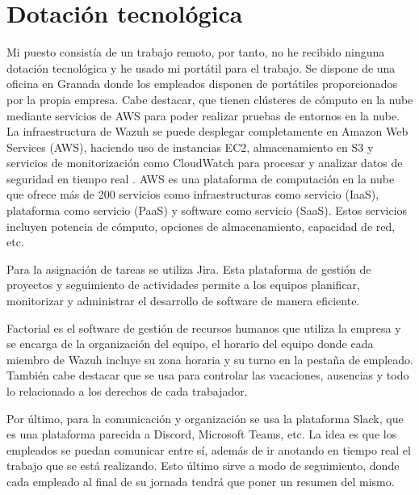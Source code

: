 \section{Dotación tecnológica}
Mi puesto consistía de un trabajo remoto, por tanto, no he recibido ninguna dotación tecnológica y he usado mi portátil para el trabajo. Se dispone de una oficina en Granada donde los empleados disponen de portátiles proporcionados por la propia empresa. Cabe destacar, que tienen clústeres de cómputo en la nube mediante servicios de AWS para poder realizar pruebas de entornos en la nube. La infraestructura de Wazuh se puede desplegar completamente en Amazon Web Services (AWS), haciendo uso de instancias EC2, almacenamiento en S3 y servicios de monitorización como CloudWatch para procesar y analizar datos de seguridad en tiempo real \cite{wazuh_agent_installation}. AWS es una plataforma de computación en la nube que ofrece más de 200 servicios como infraestructuras como servicio (IaaS), plataforma como servicio (PaaS) y software como servicio (SaaS). Estos servicios incluyen potencia de cómputo, opciones de almacenamiento, capacidad de red, etc.

Para la asignación de tareas se utiliza Jira. Esta plataforma de gestión de proyectos y seguimiento de actividades permite a los equipos planificar, monitorizar y administrar el desarrollo de software de manera eficiente.

Factorial es el software de gestión de recursos humanos que utiliza la empresa y se encarga de la organización del equipo, el horario del equipo donde cada miembro de Wazuh incluye su zona horaria y su turno en la pestaña de empleado. También cabe destacar que se usa para controlar las vacaciones, ausencias y todo lo relacionado a los derechos de cada trabajador.

Por último, para la comunicación y organización se usa la plataforma Slack, que es una plataforma parecida a Discord, Microsoft Teams, etc. La idea es que los empleados se puedan comunicar entre sí, además de ir anotando en tiempo real el trabajo que se está realizando. Esto último sirve a modo de seguimiento, donde cada empleado al final de su jornada tendrá que poner un resumen del mismo.